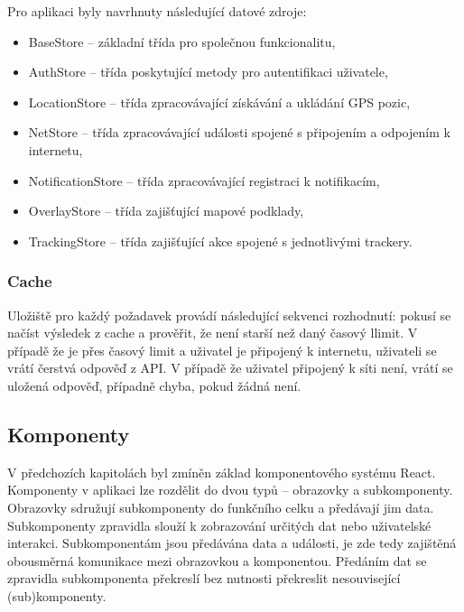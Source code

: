 Pro aplikaci byly navrhnuty následující datové zdroje:

\begin{itemize}
	\item BaseStore -- základní třída pro společnou funkcionalitu,
	\item AuthStore -- třída poskytující metody pro autentifikaci uživatele,
	\item LocationStore -- třída zpracovávající získávání a ukládání GPS pozic,
	\item NetStore -- třída zpracovávající události spojené s připojením a odpojením k internetu,
	\item NotificationStore -- třída zpracovávající registraci k notifikacím,
	\item OverlayStore -- třída zajišťující mapové podklady,
	\item TrackingStore -- třída zajišťující akce spojené s jednotlivými trackery.
\end{itemize}


\subsubsection{Cache}

Uložiště pro každý požadavek provádí následující sekvenci rozhodnutí: pokusí se načíst výsledek z cache a prověřit, že není starší než daný časový llimit. V případě že je přes časový limit a uživatel je připojený k internetu, uživateli se vrátí čerstvá odpověď z API. V případě že uživatel připojený k síti není, vrátí se uložená odpověď, případně chyba, pokud žádná není.



\subsection{Komponenty}

V předchozích kapitolách byl zmíněn základ komponentového systému React. Komponenty v aplikaci lze rozdělit do dvou typů -- obrazovky a subkomponenty. Obrazovky sdružují subkomponenty do funkčního celku a předávají jim data. Subkomponenty zpravidla slouží k zobrazování určitých dat nebo uživatelské interakci. Subkomponentám jsou předávána data a události, je zde tedy zajištěná obousměrná komunikace mezi obrazovkou a komponentou. Předáním dat se zpravidla subkomponenta překreslí bez nutnosti překreslit nesouvisející (sub)komponenty.

